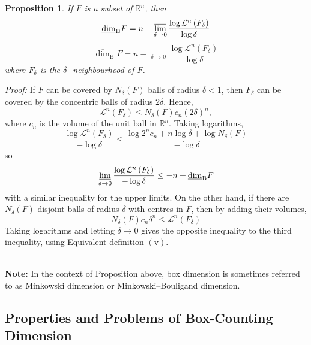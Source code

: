 \documentclass[12pt, a4paper]{article}
\DeclareMathOperator*\lowlim{\underline{lim}}
\newtheorem{proposition}{Proposition}[subsection]
\begin{document}
\begin{proposition}
    If $F$ is a subset of $\mathbb{R}^{n}$, then
$$
\underline{\operatorname{dim}}_{\mathrm{B}} F=n-\varlimsup_{\delta \rightarrow 0} \frac{\log \mathcal{L}^{n}\left(F_{\delta}\right)}{\log \delta}
$$
$$
\overline{\operatorname{dim}}_{\mathrm{B}} F=n-\lowlim_{\delta \rightarrow 0} \frac{\log \mathcal{L}^{n}\left(F_{\delta}\right)}{\log \delta}
$$
where $F_{\delta}$ is the $\delta$ -neighbourhood of $F$. 
\end{proposition}
\textit{Proof: }
If $F$ can be covered by $N_{\delta}(F)$ balls of radius $\delta<1$, then $F_{\delta}$ can be covered by the concentric balls of radius $2 \delta .$ Hence,
$$
\mathcal{L}^{n}\left(F_{\delta}\right) \leq N_{\delta}(F) c_{n}(2 \delta)^{n},
$$
where $c_{n}$ is the volume of the unit ball in $\mathbb{R}^{n} .$ Taking logarithms,
$$
\frac{\log \mathcal{L}^{n}\left(F_{\delta}\right)}{-\log \delta} \leq \frac{\log 2^{n} c_{n}+n \log \delta+\log N_{\delta}(F)}{-\log \delta}
$$
so
$$
\varliminf_{\delta \rightarrow 0} \frac{\log \mathcal{L}^{n}\left(F_{\delta}\right)}{-\log \delta} \leq -n+\underline{\operatorname{dim}}_{\mathrm{B}} F
$$
with a similar inequality for the upper limits. On the other hand, if there are $N_{\delta}(F)$ disjoint balls of radius $\delta$ with centres in $F$, then by adding their volumes,
$$
N_{\delta}(F) c_{n} \delta^{n} \leq \mathcal{L}^{n}\left(F_{\delta}\right)
$$
Taking logarithms and letting $\delta \rightarrow 0$ gives the opposite inequality to the third inequality, using Equivalent definition $(\mathrm{v})$.


\textbf{\\Note: }In the context of Proposition above, box dimension is sometimes referred to as Minkowski dimension or Minkowski–Bouligand dimension.


\newpage
\subsection{Properties and Problems of Box-Counting Dimension}
\end{document}
